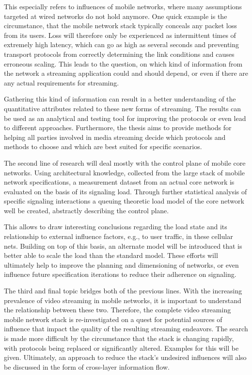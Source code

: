 This especially refers to influences of mobile networks, where many assumptions targeted at wired networks do not hold anymore. One quick example is the circumstance, that the mobile network stack typically conceals any packet loss from its users. Loss will therefore only be experienced as  intermittent times of extremely high latency, which can go as high as several seconds and preventing transport protocols from correctly determining the link conditions and causes erroneous scaling.
This leads to the question, on which kind of information from the network a streaming application could and should depend, or even if there are any actual requirements for streaming.

Gathering this kind of information can result in a better understanding of the quantitative attributes related to these new forms of streaming. The results can be used as an analytical and testing tool for improving the protocols or even lead to different approaches. Furthermore, the thesis aims to provide methods for helping all parties involved in media streaming decide which protocols and methods to choose and which are best suited for specific scenarios.


The second line of research will deal mostly with the control plane of mobile core networks. Using architectural knowledge, collected from the large stack of mobile network specifications, a measurement dataset from an actual core network is evaluated on the basis of its signaling load. Through further statistical analysis of specific signaling interactions a queuing theoretic load model of the core network well be created, abstractly describing the control plane. 

This allows to draw interesting conclusions regarding the load state and its relationship to external influence factors, e.g., to user traffic, in these cellular nets. Building on top of this basis, an alternate model will be introduced that is better able to scale the load than the standard model. These efforts will ultimately help to improve the planning and dimensioning of networks, or even influence future specification iterations to reduce their adherence on signaling.


The third and final topic bridges both of the previous lines. With the increasing prevalence of video streaming in mobile networks, it is important to understand the relationship between these two. Therefore, the complete video streaming mobile network stack is re-investigated on a quest for potential sources of influence that impact the quality of the resulting streaming endeavors. The search is made more difficult by the circumstance that the stack is changing rapidly, with protocols being replaced or significantly altered. Examples for this will be given. Ultimately, an approach to reduce the stack's undesired influences will also be discussed in the form of cross-layer information flow.

